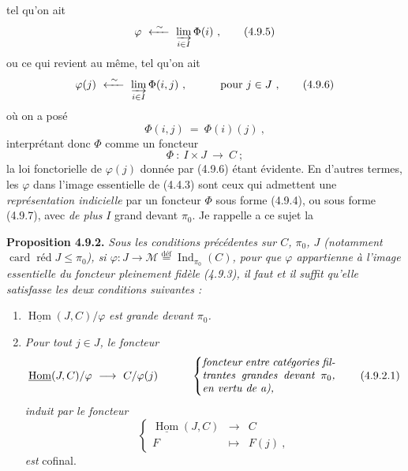\documentclass[11pt]{article}
\newcommand{\msp}[1]{\marginpar{\footnotesize [#1]}}
\newcommand{\Ind}{\operatorname{Ind}}
\newcommand{\card}{\operatorname{card}}
\newcommand{\red}{\operatorname{\text{réd}}}
\newcommand{\uHom}{\underline{\operatorname{Hom}}}
\newcommand{\cM}{\mathcal{M}}
\newcommand{\defeq}{\overset{\text{déf}}{=}}
\begin{document}
\msp{page 218}

tel qu'on ait
\[
\varphi \ \xleftarrow{\ \sim\ }\ \varinjlim_{i\in I} \Phi(i)\ , \tag*{(4.9.5)}
\]
ou ce qui revient au même, tel qu'on ait
\[
\varphi(j) \ \xleftarrow{\ \sim\ }\ \varinjlim_{i\in I} \Phi(i, j)\ , \qquad\quad \text{pour } j \in J\ , \tag*{(4.9.6)}
\]
où on a posé
\[
\Phi(i, j) \ = \ \Phi(i)(j)\ ,
\]
interprétant donc $\Phi$ comme un foncteur
\[
\Phi \ :\ I \times J \ \longrightarrow\ C\ ; \tag*{(4.9.7)}
\]
la loi fonctorielle de $\varphi(j)$ donnée par (4.9.6) étant évidente. En d'autres termes, les $\varphi$ dans l'image essentielle de (4.4.3) sont ceux qui admettent une \textit{représentation indicielle} par un foncteur $\Phi$ sous forme (4.9.4), ou sous forme (4.9.7), avec \textit{de plus} $I$ grand devant $\pi_0$. Je rappelle a ce sujet la %

\textbf{Proposition 4.9.2.} \textit{Sous les conditions précédentes sur $C$, $\pi_0$, $J$ (notamment} $\card\red J \leqslant \pi_0$\textit{), si $\varphi : J \longrightarrow \cM \defeq \Ind_{\pi_0}(C)$, pour que $\varphi$ appartienne à l'image essentielle du foncteur pleinement fidèle (4.9.3), il faut et il suffit qu'elle satisfasse les deux conditions suivantes :}

\msp{page 219}

\begin{enumerate}[leftmargin=*]
\item[\textit{a)}] $\uHom(J, C)/\varphi$ \textit{est grande devant $\pi_0$.}
\item[\textit{b)}] \textit{Pour tout $j \in J$, le foncteur}
\[
\uHom(J, C)/\varphi \ \longrightarrow\ C/\varphi(j) \qquad\quad
\left\{
\parbox{0.35\textwidth}{\textit{foncteur entre catégories filtrantes grandes devant $\pi_0$, en vertu de a),}}
\right. \tag*{(4.9.2.1)}
\]
\textit{induit par le foncteur}
\[
\left\{
\begin{array}{rcl}
\uHom(J, C) & \longrightarrow & C \\
F & \longmapsto & F(j)\ ,
\end{array}
\right. \tag*{(4.9.2.2)}
\]
\textit{est} cofinal.
\end{enumerate}
\end{document}
